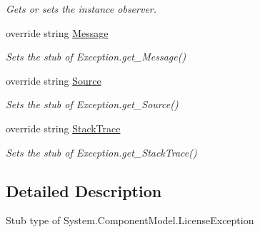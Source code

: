 \begin{DoxyCompactItemize}
\begin{DoxyCompactList}\small\item\em Gets or sets the instance observer.\end{DoxyCompactList}\item 
override string \hyperlink{class_system_1_1_component_model_1_1_fakes_1_1_stub_license_exception_a3b039ed29462ff7e80f9e690479c1f60}{Message}
\begin{DoxyCompactList}\small\item\em Sets the stub of Exception.\-get\-\_\-\-Message()\end{DoxyCompactList}\item 
override string \hyperlink{class_system_1_1_component_model_1_1_fakes_1_1_stub_license_exception_af72178e6ab9dde0a7fa9a663d8cf7f58}{Source}
\begin{DoxyCompactList}\small\item\em Sets the stub of Exception.\-get\-\_\-\-Source()\end{DoxyCompactList}\item 
override string \hyperlink{class_system_1_1_component_model_1_1_fakes_1_1_stub_license_exception_a223313c3eee2c1e40aab904af8fa1ef1}{Stack\-Trace}
\begin{DoxyCompactList}\small\item\em Sets the stub of Exception.\-get\-\_\-\-Stack\-Trace()\end{DoxyCompactList}\end{DoxyCompactItemize}


\subsection{Detailed Description}
Stub type of System.\-Component\-Model.\-License\-Exception



